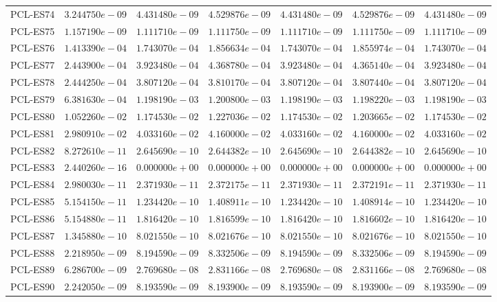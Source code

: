\begin{longtable}{lrrrrrr}
PCL-ES74 & $3.244750e-09$ & $4.431480e-09$ & $4.529876e-09$ & $4.431480e-09$ & $4.529876e-09$ & $4.431480e-09$ \\
PCL-ES75 & $1.157190e-09$ & $1.111710e-09$ & $1.111750e-09$ & $1.111710e-09$ & $1.111750e-09$ & $1.111710e-09$ \\
PCL-ES76 & $1.413390e-04$ & $1.743070e-04$ & $1.856634e-04$ & $1.743070e-04$ & $1.855974e-04$ & $1.743070e-04$ \\
PCL-ES77 & $2.443900e-04$ & $3.923480e-04$ & $4.368780e-04$ & $3.923480e-04$ & $4.365140e-04$ & $3.923480e-04$ \\
PCL-ES78 & $2.444250e-04$ & $3.807120e-04$ & $3.810170e-04$ & $3.807120e-04$ & $3.807440e-04$ & $3.807120e-04$ \\
PCL-ES79 & $6.381630e-04$ & $1.198190e-03$ & $1.200800e-03$ & $1.198190e-03$ & $1.198220e-03$ & $1.198190e-03$ \\
PCL-ES80 & $1.052260e-02$ & $1.174530e-02$ & $1.227036e-02$ & $1.174530e-02$ & $1.203665e-02$ & $1.174530e-02$ \\
PCL-ES81 & $2.980910e-02$ & $4.033160e-02$ & $4.160000e-02$ & $4.033160e-02$ & $4.160000e-02$ & $4.033160e-02$ \\
PCL-ES82 & $8.272610e-11$ & $2.645690e-10$ & $2.644382e-10$ & $2.645690e-10$ & $2.644382e-10$ & $2.645690e-10$ \\
PCL-ES83 & $2.440260e-16$ & $0.000000e+00$ & $0.000000e+00$ & $0.000000e+00$ & $0.000000e+00$ & $0.000000e+00$ \\
PCL-ES84 & $2.980030e-11$ & $2.371930e-11$ & $2.372175e-11$ & $2.371930e-11$ & $2.372191e-11$ & $2.371930e-11$ \\
PCL-ES85 & $5.154150e-11$ & $1.234420e-10$ & $1.408911e-10$ & $1.234420e-10$ & $1.408914e-10$ & $1.234420e-10$ \\
PCL-ES86 & $5.154880e-11$ & $1.816420e-10$ & $1.816599e-10$ & $1.816420e-10$ & $1.816602e-10$ & $1.816420e-10$ \\
PCL-ES87 & $1.345880e-10$ & $8.021550e-10$ & $8.021676e-10$ & $8.021550e-10$ & $8.021676e-10$ & $8.021550e-10$ \\
PCL-ES88 & $2.218950e-09$ & $8.194590e-09$ & $8.332506e-09$ & $8.194590e-09$ & $8.332506e-09$ & $8.194590e-09$ \\
PCL-ES89 & $6.286700e-09$ & $2.769680e-08$ & $2.831166e-08$ & $2.769680e-08$ & $2.831166e-08$ & $2.769680e-08$ \\
PCL-ES90 & $2.242050e-09$ & $8.193590e-09$ & $8.193900e-09$ & $8.193590e-09$ & $8.193900e-09$ & $8.193590e-09$ \\

\end{longtable}
